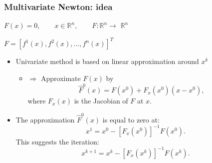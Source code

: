 \documentclass[bigger]{beamer}
\begin{document}
\begin{frame}%

\frametitle{Multivariate Newton: idea}

\begin{center}
$F(x)=0,\qquad x\in \mathbb{R}^{n},\qquad F:\mathbb{R}^{n}\rightarrow $ $%
\mathbb{R}^{n}$

$F=[f^{1}(x),f^{2}(x),...,f^{n}(x)]^{T}$
\end{center}

\begin{itemize}
\item Univariate method is based on linear approximation around $x^{k}$

\begin{itemize}
\item $\Rightarrow $ Approximate $F(x)$ by 
\begin{equation*}
\hat{F}^{0}\left( x\right) =F(x^{0})+F_{x}(x^{0})(x-x^{0}),
\end{equation*}%
where $F_{x}(x)$ is the Jacobian of $F$ at $x$.
\end{itemize}

\item The approximation $\hat{F}^{0}\left( x\right) $ is equal to zero at: 
\begin{equation*}
x^{1}=x^{0}-[F_{x}(x^{0})]^{-1}F(x^{0}).
\end{equation*}%
This suggests the iteration: 
\begin{equation*}
x^{k+1}=x^{k}-[F_{x}(x^{k})]^{-1}F(x^{k}).
\end{equation*}
\end{itemize}

\end{frame}%
\end{document}

